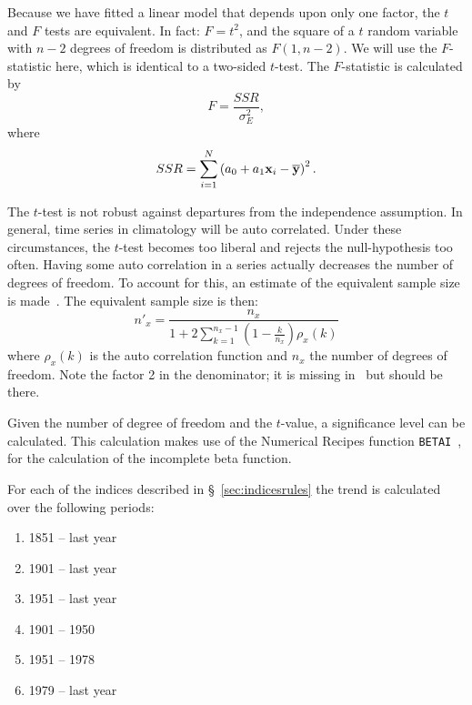 \documentclass[a4paper,11pt]{article}
\begin{document}
Because we have fitted a linear model that depends upon only one factor, the $t$ and $F$ tests are equivalent. In fact:
$F = t^2$, and the square of a $t$ random variable with $n - 2$ degrees of freedom is distributed as $F(1,n-2)$.
We will use the $F$-statistic here, which is identical to a two-sided $t$-test.
The $F$-statistic is calculated by
\begin{equation*} 
F = \frac{SSR}{\sigma_E^2},
\end{equation*}
where
\begin{equation*}
SSR = \sum_{i=1}^N \left( a_0 + a_1 {\bf x}_i - \overline{\bf y} \right)^2.
\end{equation*}


The $t$-test is not robust against departures from the independence assumption. In general, time series in climatology
will be auto correlated. Under these circumstances, the $t$-test becomes too liberal and rejects the null-hypothesis
too often. Having some auto correlation in a series actually decreases the number of degrees of freedom. To account
for this, an estimate of the equivalent sample size is made~\citep[\S 6.6.8]{vonstorch}. The equivalent sample size
is then:
\begin{equation*} 
n'_x = \frac{n_x}{1 + 2 \sum_{k=1}^{n_x-1} \left( 1 - \frac{k}{n_x} \right) \rho_x(k) }
\end{equation*}
where $\rho_x(k)$ is the auto correlation function and $n_x$ the number of degrees of freedom. Note the factor 2 in the
denominator; it is missing in~\citet[eq. 6.26]{vonstorch} but should be there.

Given the number of degree of freedom and the $t$-value, a significance level can be calculated. This calculation
makes use of the Numerical Recipes function \texttt{BETAI}~\cite{press:89},
for the calculation of the incomplete beta function.

For each of the indices described in \S~\ref{sec:indicesrules} the trend is calculated over the following periods:

\begin{enumerate}
\item 1851 -- last year
\item 1901 -- last year
\item 1951 -- last year
\item 1901 -- 1950
\item 1951 -- 1978
\item 1979 -- last year
\end{enumerate}
\end{document}
